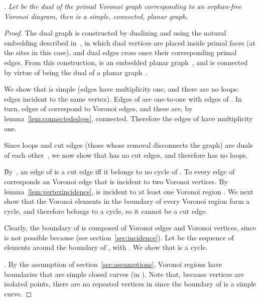 \documentclass[11pt]{article}
\begin{document}
\vspace*{0.1in}. \emph{
Let  be the dual of the primal Voronoi graph corresponding to an orphan-free Voronoi diagram, then  is a simple, connected, planar graph. 
}
\begin{proof}
The dual graph  is constructed by dualizing  
	and using the natural embedding described in~\cite[p.\ 252]{bondy2008graph}, 
	in which dual vertices are placed inside primal faces (at the sites in this case), 
	and dual edges cross once their corresponding primal edges. 
From this construction,  is an embedded planar graph~\cite[p.\ 252]{bondy2008graph}, 
	and is connected by virtue of being the dual of a planar graph~\cite[p.\ 253]{bondy2008graph}. 

We show that  is simple (edges have multiplicity one, and there are no loops: edges incident to the same vertex). 
Edges of  are one-to-one with edges of . 
In turn, edges of  correspond to Voronoi edges, and these are, 
	by lemma~\ref{lem:connectededges}, 
	connected. 
Therefore the edges of  have multiplicity one. 

Since loops and cut edges (those whose removal disconnects the graph) 
	are duals of each other~\cite[p.\ 252]{bondy2008graph}, 
	we now show that  has no cut edges, and therefore  has no loops. 

By~\cite[p.\ 86]{bondy2008graph}, 
	an edge of  is a cut edge iff it belongs to no cycle of . 
To every edge of  corresponds an Voronoi edge  that is incident to two Voronoi vertices. 
By lemma~\ref{lem:vertexincidence}, 
	 is incident to at least one Voronoi region . 
We next show that the Voronoi elements in the boundary of every Voronoi region  form a cycle, 
	and therefore  belongs to a cycle, so it cannot be a cut edge. 

Clearly, the boundary  of  is composed of Voronoi edges and Voronoi vertices, 
	since  is not possible because  (see section~\ref{sec:incidence}). 
Let  be the sequence of elements around the boundary of , 
	with . 
	We show that  is a cycle. 

\vspace*{0.05in}. 
By the assumption of section~\ref{sec:assumptions}, 
	Voronoi regions have boundaries that are simple closed curves (in ). 
Note that, because vertices are isolated points, there are no repeated vertices in  since the boundary of  is a simple curve. 



\end{proof}
\end{document}
